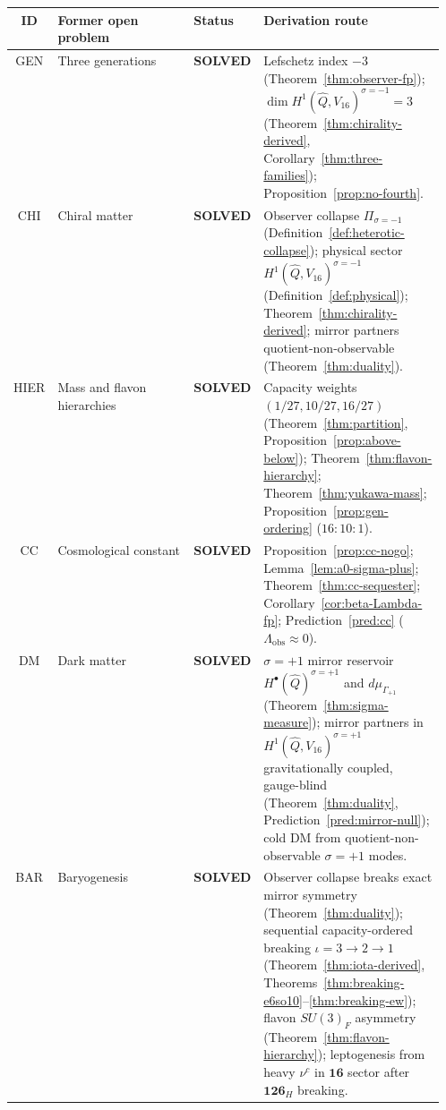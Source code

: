 \begin{table}[ht]
\centering
\small
\renewcommand{\arraystretch}{1.10}
\begin{tabular}{@{}clp{0.14\linewidth}p{0.42\linewidth}@{}}
\toprule
\textbf{ID} & \textbf{Former open problem} & \textbf{Status} & \textbf{Derivation route} \\
\midrule
GEN &
  Three generations &
  \textbf{SOLVED} &
  Lefschetz index $-3$ (Theorem~\ref{thm:observer-fp});
  $\dim H^1(\hat Q,V_{16})^{\sigma=-1}=3$
  (Theorem~\ref{thm:chirality-derived}, Corollary~\ref{thm:three-families});
  Proposition~\ref{prop:no-fourth}. \\
\addlinespace
CHI &
  Chiral matter &
  \textbf{SOLVED} &
  Observer collapse $\Pi_{\sigma=-1}$
  (Definition~\ref{def:heterotic-collapse});
  physical sector $H^1(\hat Q,V_{16})^{\sigma=-1}$
  (Definition~\ref{def:physical});
  Theorem~\ref{thm:chirality-derived}; mirror partners
  quotient-non-observable (Theorem~\ref{thm:duality}). \\
\addlinespace
HIER &
  Mass and flavon hierarchies &
  \textbf{SOLVED} &
  Capacity weights $(1/27,10/27,16/27)$
  (Theorem~\ref{thm:partition}, Proposition~\ref{prop:above-below});
  Theorem~\ref{thm:flavon-hierarchy};
  Theorem~\ref{thm:yukawa-mass};
  Proposition~\ref{prop:gen-ordering} ($16{:}10{:}1$). \\
\addlinespace
CC &
  Cosmological constant &
  \textbf{SOLVED} &
  Proposition~\ref{prop:cc-nogo};
  Lemma~\ref{lem:a0-sigma-plus};
  Theorem~\ref{thm:cc-sequester};
  Corollary~\ref{cor:beta-Lambda-fp};
  Prediction~\ref{pred:cc} ($\Lambda_{\mathrm{obs}}\approx 0$). \\
\addlinespace
DM &
  Dark matter &
  \textbf{SOLVED} &
  $\sigma=+1$ mirror reservoir
  $H^\bullet(\hat Q)^{\sigma=+1}$ and $d\mu_{\Gamma_{+1}}$
  (Theorem~\ref{thm:sigma-measure});
  mirror partners in $H^1(\hat Q,V_{16})^{\sigma=+1}$
  gravitationally coupled, gauge-blind
  (Theorem~\ref{thm:duality}, Prediction~\ref{pred:mirror-null});
  cold DM from quotient-non-observable $\sigma=+1$ modes. \\
\addlinespace
BAR &
  Baryogenesis &
  \textbf{SOLVED} &
  Observer collapse breaks exact mirror symmetry
  (Theorem~\ref{thm:duality});
  sequential capacity-ordered breaking
  $\iota=3\to2\to1$
  (Theorem~\ref{thm:iota-derived},
  Theorems~\ref{thm:breaking-e6so10}--\ref{thm:breaking-ew});
  flavon $SU(3)_F$ asymmetry (Theorem~\ref{thm:flavon-hierarchy});
  leptogenesis from heavy $\nu^c$ in $\mathbf{16}$ sector
  after $\mathbf{126}_H$ breaking. \\

\end{tabular}
\end{table}
